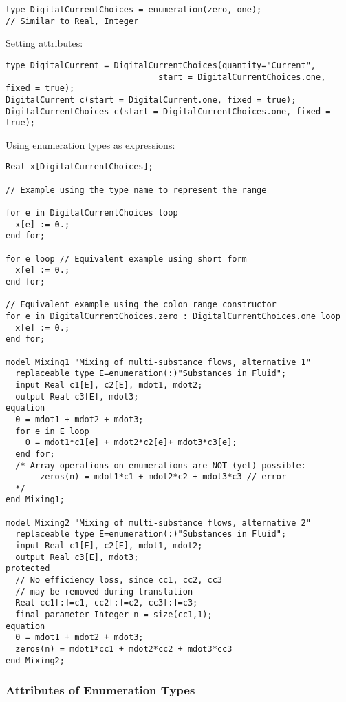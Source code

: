 \begin{example}
\begin{lstlisting}[language=modelica]
type DigitalCurrentChoices = enumeration(zero, one);
// Similar to Real, Integer
\end{lstlisting}

Setting attributes:
\begin{lstlisting}[language=modelica]
type DigitalCurrent = DigitalCurrentChoices(quantity="Current",
                               start = DigitalCurrentChoices.one, fixed = true);
DigitalCurrent c(start = DigitalCurrent.one, fixed = true);
DigitalCurrentChoices c(start = DigitalCurrentChoices.one, fixed = true);
\end{lstlisting}

Using enumeration types as expressions:
\begin{lstlisting}[language=modelica]
Real x[DigitalCurrentChoices];

// Example using the type name to represent the range

for e in DigitalCurrentChoices loop
  x[e] := 0.;
end for;

for e loop // Equivalent example using short form
  x[e] := 0.;
end for;

// Equivalent example using the colon range constructor
for e in DigitalCurrentChoices.zero : DigitalCurrentChoices.one loop
  x[e] := 0.;
end for;

model Mixing1 "Mixing of multi-substance flows, alternative 1"
  replaceable type E=enumeration(:)"Substances in Fluid";
  input Real c1[E], c2[E], mdot1, mdot2;
  output Real c3[E], mdot3;
equation
  0 = mdot1 + mdot2 + mdot3;
  for e in E loop
    0 = mdot1*c1[e] + mdot2*c2[e]+ mdot3*c3[e];
  end for;
  /* Array operations on enumerations are NOT (yet) possible:
       zeros(n) = mdot1*c1 + mdot2*c2 + mdot3*c3 // error
  */
end Mixing1;

model Mixing2 "Mixing of multi-substance flows, alternative 2"
  replaceable type E=enumeration(:)"Substances in Fluid";
  input Real c1[E], c2[E], mdot1, mdot2;
  output Real c3[E], mdot3;
protected
  // No efficiency loss, since cc1, cc2, cc3
  // may be removed during translation
  Real cc1[:]=c1, cc2[:]=c2, cc3[:]=c3;
  final parameter Integer n = size(cc1,1);
equation
  0 = mdot1 + mdot2 + mdot3;
  zeros(n) = mdot1*cc1 + mdot2*cc2 + mdot3*cc3
end Mixing2;
\end{lstlisting}
\end{example}

\subsubsection{Attributes of Enumeration Types}\label{attributes-of-enumeration-types}

